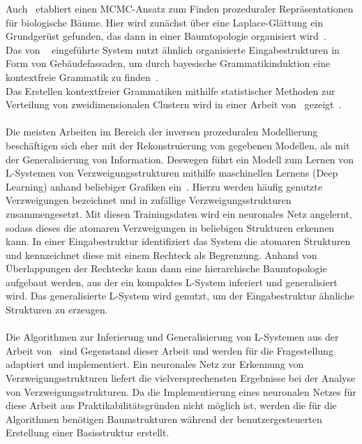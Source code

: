 Auch~\citeauthor{stava_2014} etabliert einen MCMC-Ansatz zum Finden prozeduraler Repräsentationen für biologische Bäume.
Hier wird zunächst über eine Laplace-Glättung ein Grundgerüst gefunden, das dann in einer Baumtopologie organisiert wird~\cite{stava_2014}.\\
Das von ~\citeauthor{martinovic_2013} eingeführte System nutzt ähnlich organisierte Eingabestrukturen in Form von
Gebäudefassaden, um durch bayesische Grammatikinduktion eine kontextfreie Grammatik zu finden~\cite{martinovic_2013}.\\
Das Erstellen kontextfreier Grammatiken mithilfe statistischer Methoden zur Verteilung von zweidimensionalen Clustern
wird in einer Arbeit von~\citeauthor{stava_2010} gezeigt~\cite{stava_2010}.\\~\\
Die meisten Arbeiten im Bereich der inversen prozeduralen Modellierung beschäftigen sich eher mit der Rekonstruierung von
gegebenen Modellen, als mit der Generalisierung von Information.
Deswegen führt \citeauthor{guo_2020} ein Modell zum Lernen von L-Systemen von Verzweigungsstrukturen mithilfe maschinellen
Lernens (Deep Learning) anhand beliebiger Grafiken ein~\cite{guo_2020}.
Hierzu werden häufig genutzte Verzweigungen bezeichnet und in zufällige Verzweigungsstrukturen zusammengesetzt.
Mit diesen Trainingsdaten wird ein neuronales Netz angelernt, sodass dieses die atomaren Verzweigungen in beliebigen
Strukturen erkennen kann.
In einer Eingabestruktur identifiziert das System die atomaren Strukturen und kennzeichnet diese mit einem Rechteck als Begrenzung.
Anhand von Überlappungen der Rechtecke kann dann eine hierarchische Baumtopologie aufgebaut werden, aus der ein kompaktes
L-System inferiert und generalisiert wird.
Das generalisierte L-System wird genutzt, um der Eingabestruktur ähnliche Strukturen zu erzeugen.\\~\\
Die Algorithmen zur Inferierung und Generalisierung von L-Systemen aus der Arbeit von~\citeauthor{guo_2020} sind
Gegenstand dieser Arbeit und werden für die Fragestellung adaptiert und implementiert.
Ein neuronales Netz zur Erkennung von Verzweigungsstrukturen liefert die vielversprechensten Ergebnisse bei der Analyse
von Verzweigungsstrukturen.
Da die Implementierung eines neuronalen Netzes für diese Arbeit aus Praktikabilitätsgründen nicht möglich ist,
werden die für die Algorithmen benötigen Baumstrukturen während der benutzergesteuerten Erstellung einer Basisstruktur
erstellt.